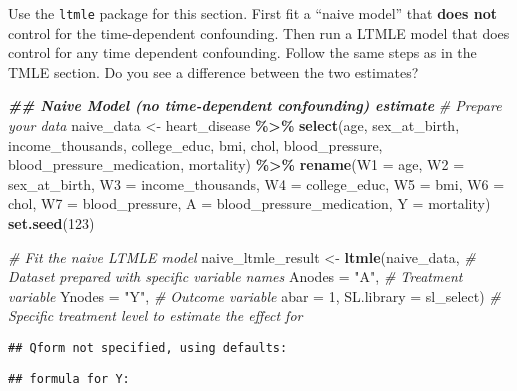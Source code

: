 \documentclass[
]{article}
\newenvironment{Shaded}{\begin{snugshade}}{\end{snugshade}}
\newcommand{\AttributeTok}[1]{\textcolor[rgb]{0.13,0.29,0.53}{#1}}
\newcommand{\CommentTok}[1]{\textcolor[rgb]{0.56,0.35,0.01}{\textit{#1}}}
\newcommand{\DecValTok}[1]{\textcolor[rgb]{0.00,0.00,0.81}{#1}}
\newcommand{\DocumentationTok}[1]{\textcolor[rgb]{0.56,0.35,0.01}{\textbf{\textit{#1}}}}
\newcommand{\FunctionTok}[1]{\textcolor[rgb]{0.13,0.29,0.53}{\textbf{#1}}}
\newcommand{\NormalTok}[1]{#1}
\newcommand{\OtherTok}[1]{\textcolor[rgb]{0.56,0.35,0.01}{#1}}
\newcommand{\SpecialCharTok}[1]{\textcolor[rgb]{0.81,0.36,0.00}{\textbf{#1}}}
\newcommand{\StringTok}[1]{\textcolor[rgb]{0.31,0.60,0.02}{#1}}
\begin{document}
Use the \texttt{ltmle} package for this section. First fit a ``naive
model'' that \textbf{does not} control for the time-dependent
confounding. Then run a LTMLE model that does control for any time
dependent confounding. Follow the same steps as in the TMLE section. Do
you see a difference between the two estimates?

\begin{Shaded}
\begin{Highlighting}[]
\DocumentationTok{\#\# Naive Model (no time{-}dependent confounding) estimate}
\CommentTok{\# Prepare your data}
\NormalTok{naive\_data }\OtherTok{\textless{}{-}}\NormalTok{ heart\_disease }\SpecialCharTok{\%\textgreater{}\%}
  \FunctionTok{select}\NormalTok{(age, sex\_at\_birth, income\_thousands, college\_educ, bmi, chol, blood\_pressure, blood\_pressure\_medication, mortality) }\SpecialCharTok{\%\textgreater{}\%}
  \FunctionTok{rename}\NormalTok{(}\AttributeTok{W1 =}\NormalTok{ age, }\AttributeTok{W2 =}\NormalTok{ sex\_at\_birth, }\AttributeTok{W3 =}\NormalTok{ income\_thousands, }\AttributeTok{W4 =}\NormalTok{ college\_educ, }\AttributeTok{W5 =}\NormalTok{ bmi, }\AttributeTok{W6 =}\NormalTok{ chol, }\AttributeTok{W7 =}\NormalTok{ blood\_pressure,}
         \AttributeTok{A =}\NormalTok{ blood\_pressure\_medication, }\AttributeTok{Y =}\NormalTok{ mortality)}
\FunctionTok{set.seed}\NormalTok{(}\DecValTok{123}\NormalTok{)}

\CommentTok{\# Fit the naive LTMLE model}
\NormalTok{naive\_ltmle\_result }\OtherTok{\textless{}{-}} \FunctionTok{ltmle}\NormalTok{(naive\_data,  }\CommentTok{\# Dataset prepared with specific variable names}
                            \AttributeTok{Anodes =} \StringTok{"A"}\NormalTok{,  }\CommentTok{\# Treatment variable}
                            \AttributeTok{Ynodes =} \StringTok{"Y"}\NormalTok{,  }\CommentTok{\# Outcome variable}
                            \AttributeTok{abar =} \DecValTok{1}\NormalTok{,}
                            \AttributeTok{SL.library =}\NormalTok{ sl\_select)  }\CommentTok{\# Specific treatment level to estimate the effect for}
\end{Highlighting}
\end{Shaded}

\begin{verbatim}
## Qform not specified, using defaults:
\end{verbatim}

\begin{verbatim}
## formula for Y:
\end{verbatim}
\end{document}
